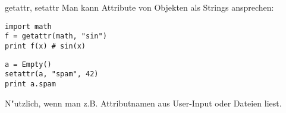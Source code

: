 \begin{frame}[fragile]{getattr, setattr}
Man kann Attribute von Objekten als Strings ansprechen:
\begin{lstlisting}
import math
f = getattr(math, "sin")
print f(x) # sin(x)
\end{lstlisting}
\vspace{2mm}
\begin{lstlisting}
a = Empty()
setattr(a, "spam", 42)
print a.spam
\end{lstlisting}
N"utzlich, wenn man z.B. Attributnamen aus User-Input oder Dateien liest.
\end{frame}

